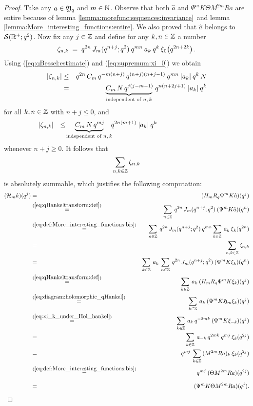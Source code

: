\begin{proof}
Take any $a\in {\mathfrak Y}_q$ and $m\in\mathbb{N}$.
Observe that both $\hat{a}$ and $\Psi^m K \Theta M^{2m} R a$ are entire
because of lemma \ref{lemma:morefunc:sequences:invariance}\ and lemma
\ref{lemma:More_interesting_functions:entire}\@.
We also proved that $\hat{a}$ belongs to ${\mathcal S}(\mathbb{R}^+;q^2)$.
Now fix any $j\in \mathbb{Z}$ and define for any $k,n \in \mathbb{Z}$ a number
$$ \zeta_{n,k}   \;=\;
     q^{2n} \, \J{m}{q^{n+j}} \: q^{mn} \: a_k \: q^k\: \xi_0 \!\left(q^{2n+2k}\vertM\right). $$
Using (\ref{eq:qBessel:estimate}) and (\ref{eq:supremum:xi_0}) we obtain
\begin{eqnarray*}
|\zeta_{n,k}|
&\leq&
      q^{2n} \, C_m \, q^{-m(n+j)} \, q^{(n+j)(n+j-1)} \: q^{mn} \: |a_k| \: q^k  \, N
\\&=&
      \underbrace{C_m \, N \, q^{j(j-m-1)}\!}_{
                  \mbox{\scriptsize independent of $n,k$}}
       \; q^{n(n+2j+1)} \: |a_k| \: q^k
\end{eqnarray*}
for all $k,n \in \mathbb{Z}$ with $n+j \leq 0$, and
$$ |\zeta_{n,k}|  \hspace {0.7em}
         \leq  \! \underbrace{C_m \, N \, q^{mj}\!}_{
                  \mbox{\scriptsize independent of $n,k$}}
                         \!\!  q^{2n(m+1)}  \: |a_k| \: q^k
                  \hspace{8.5em} $$
whenever $n+j \geq 0$. It follows that
$$  \sum_{n,k\in\mathbb{Z}}   \zeta_{n,k} $$
is absolutely summable, which justifies the following computation:
\begin{eqnarray*}
(\auxH{m} \hat{a})(q^j)
&=&
(H_m R_q \Psi^{m} K \hat{a})(q^j)
\\ &\stackrel{(\ref{eq:qHankeltransform:def})}{=}&
\sum_{n\in \ZZ} \: q^{2n} \, \J{m}{q^{n+j}}  \: (\Psi^{m} K \hat{a})(q^n)
\\&\stackrel{(\ref{eq:def:More_interesting_functions:bis})}{=}&
\sum_{n\in \ZZ} \:  q^{2n} \, \J{m}{q^{n+j}} \: q^{mn}
\sum_{k\in\ZZ}  \:  a_k \: \xi_k(q^{2n})
\\&=&
\sum_{n,k\in\ZZ}   \zeta_{n,k}
\\&=&
\sum_{k\in \ZZ} \:  a_k \: \sum_{n\in \ZZ}
     \: q^{2n} \, \J{m}{q^{n+j}} \: (\Psi^{m} K \xi_k)(q^n)
\\ &\stackrel{(\ref{eq:qHankeltransform:def})}{=}&
\sum_{k\in \ZZ}  \: a_k \: (H_m R_q \Psi^{m} K \xi_k)(q^j)
\\&\stackrel{(\ref{eq:diagram:holomorphic_qHankel})}{=}&
\sum_{k\in \ZZ}  \: a_k \: (\Psi^{m} K \holH{m} \xi_k)(q^j)
\\&\stackrel{(\ref{eq:xi_k_under_Hol_hankel})}{=}&
\sum_{k\in \ZZ}  \: a_k \: q^{-2mk}\: (\Psi^{m} K \xi_{-k})(q^j)
\\&=&
\sum_{k\in \ZZ}  \: a_{-k} \: q^{2mk} \: q^{mj} \: \xi_k (q^{2j})
\\&=&
q^{mj} \: \sum_{k\in \ZZ}  \: (M^{2m} R a)_k  \: \xi_k (q^{2j})
\\&\stackrel{(\ref{eq:def:More_interesting_functions:bis})}{=}&
q^{mj} \: (\Theta M^{2m} R a) (q^{2j})
\\ \vertXL &=&
(\Psi^m K \Theta M^{2m} R a) (q^j).
\end{eqnarray*}




\end{proof}
